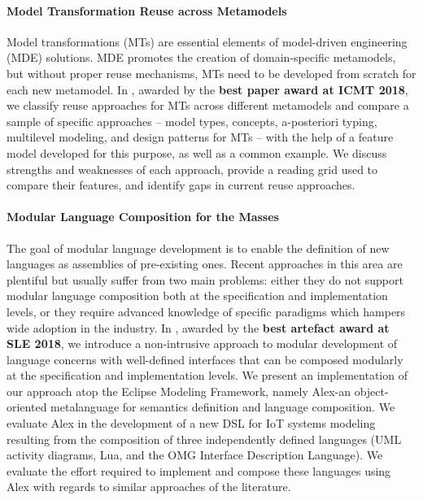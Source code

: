 \paragraph{Model Transformation Reuse across Metamodels}
Model transformations (MTs) are essential elements of model-driven engineering (MDE) solutions. MDE promotes the creation of domain-specific metamodels, but without proper reuse mechanisms, MTs need to be developed from scratch for each new metamodel. In \cite{bruel:hal-01910113}, awarded by the \textbf{best paper award at ICMT 2018}, we classify reuse approaches for MTs across different metamodels and compare a sample of specific approaches -- model types, concepts, a-posteriori typing, multilevel modeling, and design patterns for MTs -- with the help of a feature model developed for this purpose, as well as a common example. We discuss strengths and weaknesses of each approach, provide a reading grid used to compare their features, and identify gaps in current reuse approaches.

\paragraph{Modular Language Composition for the Masses}
The goal of modular language development is to enable the definition of new languages as assemblies of pre-existing ones. Recent approaches in this area are plentiful but usually suffer from two main problems: either they do not support modular language composition both at the specification and implementation levels, or they require advanced knowledge of specific paradigms which hampers wide adoption in the industry. In \cite{leduc:hal-01890446}, awarded by the \textbf{best artefact award at SLE 2018}, we introduce a non-intrusive approach to modular development of language concerns with well-defined interfaces that can be composed modularly at the specification and implementation levels. We present an implementation of our approach atop the Eclipse Modeling Framework, namely Alex-an object-oriented metalanguage for semantics definition and language composition. We evaluate Alex in the development of a new DSL for IoT systems modeling resulting from the composition of three independently defined languages (UML activity diagrams, Lua, and the OMG Interface Description Language). We evaluate the effort required to implement and compose these languages using Alex with regards to similar approaches of the literature.

